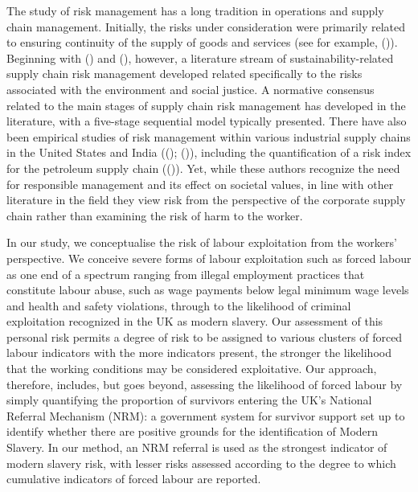 \documentclass[
  12pt,
]{article}
\theoremstyle{plain}
\theoremstyle{definition}
\begin{document}
The study of risk management has a long tradition in operations and
supply chain management. Initially, the risks under consideration were
primarily related to ensuring continuity of the supply of goods and
services (see for example,
()).
Beginning with
()
and
(),
however, a literature stream of sustainability-related supply chain risk
management developed related specifically to the risks associated with
the environment and social justice. A normative consensus related to the
main stages of supply chain risk management has developed in the
literature, with a five-stage sequential model typically presented.
There have also been empirical studies of risk management within various
industrial supply chains in the United States and India
(();
()),
including the quantification of a risk index for the petroleum supply
chain
(()).
Yet, while these authors recognize the need for responsible management
and its effect on societal values, in line with other literature in the
field they view risk from the perspective of the corporate supply chain
rather than examining the risk of harm to the worker.

In our study, we conceptualise the risk of labour exploitation from the
workers' perspective. We conceive severe forms of labour exploitation
such as forced labour as one end of a spectrum ranging from illegal
employment practices that constitute labour abuse, such as wage payments
below legal minimum wage levels and health and safety violations,
through to the likelihood of criminal exploitation recognized in the UK
as modern slavery. Our assessment of this personal risk permits a degree
of risk to be assigned to various clusters of forced labour indicators
with the more indicators present, the stronger the likelihood that the
working conditions may be considered exploitative. Our approach,
therefore, includes, but goes beyond, assessing the likelihood of forced
labour by simply quantifying the proportion of survivors entering the
UK's National Referral Mechanism (NRM): a government system for survivor
support set up to identify whether there are positive grounds for the
identification of Modern Slavery. In our method, an NRM referral is used
as the strongest indicator of modern slavery risk, with lesser risks
assessed according to the degree to which cumulative indicators of
forced labour are reported.
\end{document}
